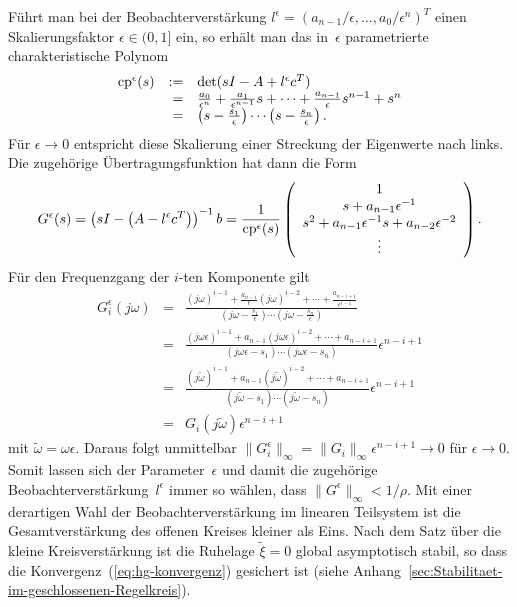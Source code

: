 \begin{svmultproof2}
Führt man bei der Beobachterverstärkung $l^{\epsilon}=(a_{n-1}/\epsilon,\ldots,a_{0}/\epsilon^{n})^{T}$
einen Skalierungsfaktor $\epsilon\in(0,1]$ ein, so erhält man das
in~$\epsilon$ parametrierte charakteristische Polynom
\begin{equation}
\begin{array}{lrl}
{\operatorname{cp}}^{\epsilon}(s) & := & \det(sI-A+l^{\epsilon}c^{T})\\
 & = & \frac{a_{0}}{\epsilon^{n}}+\frac{a_{1}}{\epsilon^{n-1}}s+\cdots+\frac{a_{n-1}}{\epsilon}s^{n-1}+s^{n}\\
 & = & \left(s-\frac{s_{1}}{\epsilon}\right)\cdots\left(s-\frac{s_{n}}{\epsilon}\right).
\end{array}\label{eq:hg-cp-epsilon}
\end{equation}
Für $\epsilon\to0$ entspricht diese Skalierung einer Streckung der
Eigenwerte nach links. Die zugehörige Übertragungsfunktion hat dann
die Form
\[
G^{\epsilon}(s)=\left(sI-\left(A-l^{\epsilon}c^{T}\right)\right)^{-1}b=\frac{1}{{\operatorname{cp}}^{\epsilon}(s)}\left(\begin{array}{c}
1\\
s+a_{n-1}\epsilon^{-1}\\
s^{2}+a_{n-1}\epsilon^{-1}s+a_{n-2}\epsilon^{-2}\\
\vdots
\end{array}\right).
\]
Für den Frequenzgang der $i$-ten Komponente gilt
\[
\begin{array}{ccl}
G_{i}^{\epsilon}(j\omega) & = & \frac{(j\omega)^{i-1}+\frac{a_{n-1}}{\epsilon}(j\omega)^{i-2}+\cdots+\frac{a_{n-i+1}}{\epsilon^{i-1}}}{\left(j\omega-\frac{s_{1}}{\epsilon}\right)\cdots\left(j\omega-\frac{s_{n}}{\epsilon}\right)}\\
 & = & \frac{(j\omega\epsilon)^{i-1}+a_{n-1}(j\omega\epsilon)^{i-2}+\cdots+a_{n-i+1}}{\left(j\omega\epsilon-s_{1}\right)\cdots\left(j\omega\epsilon-s_{n}\right)}\epsilon^{n-i+1}\\
 & = & \frac{(j\tilde{\omega})^{i-1}+a_{n-1}(j\tilde{\omega})^{i-2}+\cdots+a_{n-i+1}}{\left(j\tilde{\omega}-s_{1}\right)\cdots\left(j\tilde{\omega}-s_{n}\right)}\epsilon^{n-i+1}\\
 & = & G_{i}(j\tilde{\omega})\epsilon^{n-i+1}
\end{array}
\]
mit $\tilde{\omega}=\omega\epsilon$. Daraus folgt unmittelbar $\|G_{i}^{\epsilon}\|_{\infty}=\|G_{i}\|_{\infty}\epsilon^{n-i+1}\to0$
für $\epsilon\to0$. Somit lassen sich der Parameter~$\epsilon$
und damit die zugehörige Beobachterverstärkung~$l^{\epsilon}$ immer
so wählen, dass $\|G^{\epsilon}\|_{\infty}<1/\rho$. Mit einer derartigen
Wahl der Beobachterverstärkung im linearen Teilsystem ist die Gesamtverstärkung
des offenen Kreises kleiner als Eins. Nach dem Satz über die kleine
Kreisverstärkung ist die Ruhelage $\tilde{\xi}=0$ global asymptotisch
stabil, so dass die Konvergenz~(\ref{eq:hg-konvergenz}) gesichert
ist (siehe Anhang~\ref{sec:Stabilitaet-im-geschlossenen-Regelkreis}).
\end{svmultproof2}

